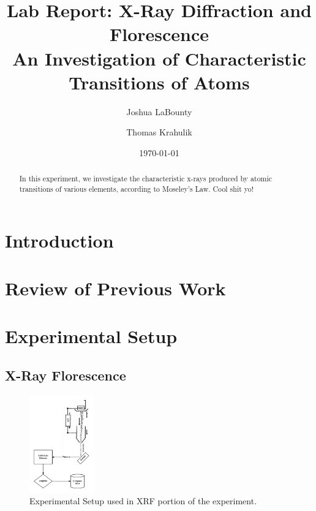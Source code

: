 \documentclass[%
 reprint,
 amsmath,amssymb,
 aps,
 pra,
]{revtex4-1}
\begin{document}

\title{\textbf{Lab Report: X-Ray Diffraction and Florescence} \\ \small{An Investigation of Characteristic Transitions of Atoms}}
\author{Joshua LaBounty}
\author{Thomas Krahulik}

\date{\today}

\begin{abstract}
	In this experiment, we investigate the characteristic x-rays produced by atomic transitions of various elements, according to Moseley's Law. Cool shit yo!
\end{abstract}
\maketitle

\section{Introduction}

\section{Review of Previous Work}

\section{Experimental Setup}

\subsection{X-Ray Florescence}

\begin{figure}[H]
	\centering
	\includegraphics[width=0.25\textwidth]{xrf_experiment.png}
	\caption{Experimental Setup used in XRF portion of the experiment.}
	\label{fig:xrf_setup}
\end{figure}
\end{document}
